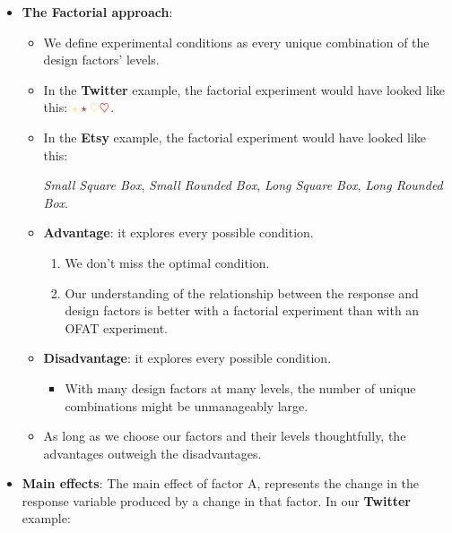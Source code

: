 \begin{itemize}
      \item \textbf{The Factorial approach}:
            \begin{itemize}
                  \item We define experimental conditions as every unique combination of the design factors' levels.
                  \item In the \textbf{Twitter} example, the factorial experiment would have looked like this:
                        $ \color{yellow}\star\color{red}\star\color{yellow}\heartsuit\color{red}\heartsuit $.
                  \item In the \textbf{Etsy} example, the factorial experiment would have looked like this:
                        \begin{tightcenter}
                              \emph{Small Square Box}, \emph{Small Rounded Box}, \emph{Long Square Box}, \emph{Long Rounded Box}.
                        \end{tightcenter}
                  \item \textbf{Advantage}: it explores every possible condition.
                        \begin{enumerate}[1.]
                              \item We don't miss the optimal condition.
                              \item Our understanding of the relationship between the response and design factors is better with a factorial experiment than with an OFAT experiment.
                        \end{enumerate}
                  \item \textbf{Disadvantage}: it explores every possible condition.
                        \begin{itemize}
                              \item With many design factors at many levels, the number of unique combinations might be unmanageably large.
                        \end{itemize}
                  \item As long as we choose our factors and their levels thoughtfully, the advantages outweigh the
                        disadvantages.
            \end{itemize}
      \item \textbf{Main effects}: The main effect of factor A, represents the change in the response variable produced
            by a change in that factor. In our \textbf{Twitter} example:

\end{itemize}
